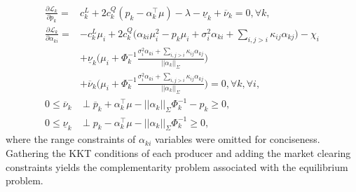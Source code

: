 \documentclass{article}
\begin{document}
\begin{align*}
\frac{\partial \mathcal{L}_k}{\partial p_k} =& c_k^L + 2 c_k^Q (p_k - \alpha_k^\top \mu) - \lambda - \underline{\nu}_k + \overline{\nu}_k = 0, \forall k,\\
\frac{\partial \mathcal{L}_k}{\partial \alpha_{ki}} =& - c_k^L \mu_i + 2 c_k^Q\Big(\alpha_{ki}\mu_i^2 - p_k \mu_i + \sigma_i^2 \alpha_{ki} + \sum_{i, j>i} \kappa_{ij} \alpha_{kj}\Big) - \chi_i \\
&+ \underline{\nu}_k \Big(\mu_i + \Phi_k^{-1} \frac{\sigma_i^2 \alpha_{ki} + \sum_{i, j>i} \kappa_{ij} \alpha_{kj}}{||\alpha_k||_{\Sigma}}\Big)\\
&+ \overline{\nu}_k \Big(\mu_i + \Phi_k^{-1} \frac{\sigma_i^2 \alpha_{ki} + \sum_{i, j>i} \kappa_{ij} \alpha_{kj}}{||\alpha_k||_{\Sigma}}\Big) = 0, \forall k, \forall i,\\
0 \le \overline{\nu}_k &\perp \overline{p}_k + \alpha_k^\top \mu - ||\alpha_k||_{\Sigma} \Phi_k^{-1} - p_k \ge 0,\\
0 \le \underline{\nu}_k & \perp p_k - \alpha_k^\top \mu - ||\alpha_k||_{\Sigma}\Phi_k^{-1} \ge 0,
\end{align*}
where the range constraints of $\alpha_{ki}$ variables were omitted for conciseness. Gathering the KKT conditions of each producer and adding the market clearing constraints yields the complementarity problem associated with the equilibrium problem.
\end{document}
